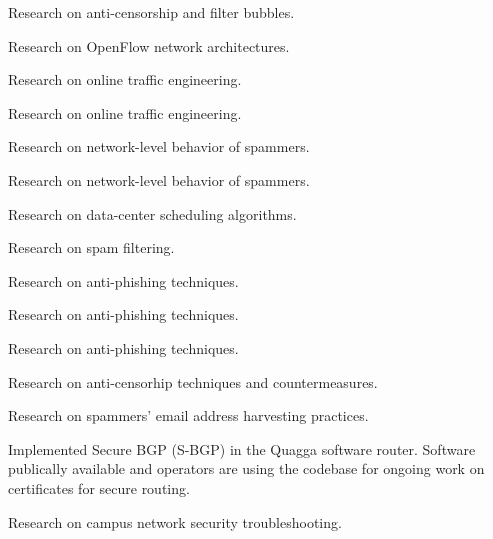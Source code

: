 \begin{description}

{Research on anti-censorship and filter bubbles.}

{Research on OpenFlow network architectures.}

{Research on online traffic engineering.}

{Research on online traffic engineering.}

{Research on network-level behavior of spammers.}

{Research on network-level behavior of spammers.}


{Research on data-center scheduling algorithms.}


{Research on spam filtering.}

{Research on anti-phishing techniques.}


{Research on anti-phishing techniques.}


{Research on anti-phishing techniques.}

{}{Research on anti-censorhip techniques and countermeasures.}

{Research on spammers' email address harvesting practices.}



{}{Implemented Secure BGP (S-BGP) in the Quagga software router.
Software publically available and operators are using the codebase for
ongoing work on certificates for secure routing.}



{}{Research on campus network security troubleshooting.}






\end{description}



